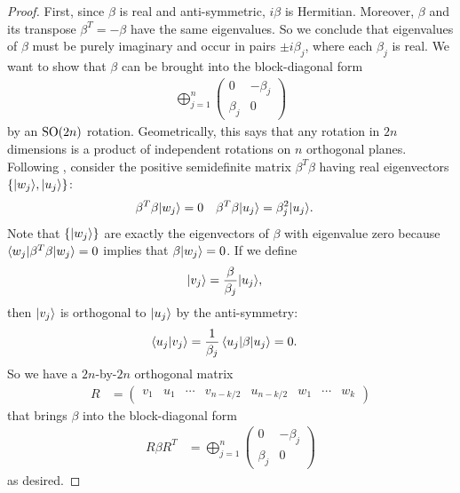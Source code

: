 \begin{proof}
	First, since $\beta$ is real and anti-symmetric, $i\beta$ is Hermitian. Moreover, $\beta$ and its transpose $\beta^T = -\beta$ have the same eigenvalues. So we conclude that eigenvalues of $\beta$ must be purely imaginary and occur in pairs $\pm i\beta_j$, where each $\beta_j$ is real.
	We want to show that $\beta$ can be brought into the block-diagonal form
	\begin{align}
		\bigoplus_{j=1}^n \begin{pmatrix}
			0 & -\beta_j \\
			\beta_j & 0
		\end{pmatrix}
	\end{align}
	by an $\text{SO}(2n)$ rotation. Geometrically, this says that any rotation in $2n$ dimensions is a product of independent rotations on $n$ orthogonal planes. Following \cite[Appendix D.4]{dreiner_two-component_2010}, consider the positive semidefinite matrix $\beta^T\beta$ having real eigenvectors $\{ {\left\vert{w_j}\right\rangle}, {\left\vert{u_j}\right\rangle} \}$:
	\begin{align}
		\beta^T\beta {\left\vert{w_j}\right\rangle} &= 0 & \beta^T\beta {\left\vert{u_j}\right\rangle} &= \beta_j^2 {\left\vert{u_j}\right\rangle}.
	\end{align}
	Note that $\{ {\left\vert{w_j}\right\rangle}\}$ are exactly the eigenvectors of $\beta$ with eigenvalue zero because $\braket{w_j| \beta^T\beta |w_j} = 0$ implies that $\beta{\left\vert{w_j}\right\rangle} = 0$. If we define
	\begin{align}
		{\left\vert{v_j}\right\rangle} &= \frac{\beta}{\beta_j} {\left\vert{u_j}\right\rangle},
	\end{align}
	then ${\left\vert{v_j}\right\rangle}$ is orthogonal to ${\left\vert{u_j}\right\rangle}$ by the anti-symmetry:
	\begin{align}
		\braket{u_j|v_j} &= \frac{1}{\beta_j} \braket{u_j|\beta|u_j} =0.
	\end{align}
	So we have a $2n$-by-$2n$ orthogonal matrix
	\begin{align}
		R &= \begin{pmatrix}
			v_1 & u_1 & \cdots & v_{n-k/2} & u_{n-k/2} & w_1 & \cdots & w_k
		\end{pmatrix}
	\end{align}
	that brings $\beta$ into the block-diagonal form
	\begin{align}
		R \beta R^T &= \bigoplus_{j=1}^n \begin{pmatrix}
				0 & -\beta_j \\
				\beta_j & 0
			\end{pmatrix}
	\end{align}
	as desired.
\end{proof}
